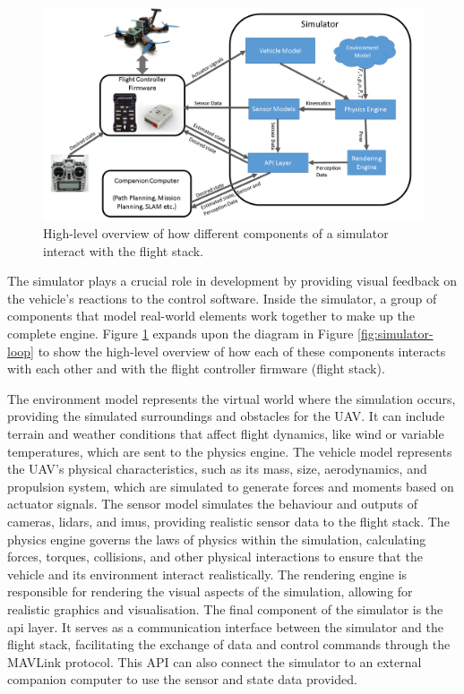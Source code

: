 \begin{figure}
  \centering
  \includegraphics[width=\textwidth,keepaspectratio]{img/airsim-overview.png}
  \caption{High-level overview of how different components of a simulator interact with the flight stack.}
  \label{fig:airsim-overview}
\end{figure}

The simulator plays a crucial role in development by providing visual feedback on the vehicle’s reactions to the control software.
Inside the simulator, a group of components that model real-world elements work together to make up the complete engine.
Figure \ref{fig:airsim-overview} expands upon the diagram in Figure \ref{fig:simulator-loop} to show the high-level overview of how each of these components interacts with each other and with the flight controller firmware (flight stack).

The environment model represents the virtual world where the simulation occurs, providing the simulated surroundings and obstacles for the UAV. It can include terrain and weather conditions that affect flight dynamics, like wind or variable temperatures, which are sent to the physics engine. 
The vehicle model represents the UAV's physical characteristics, such as its mass, size, aerodynamics, and propulsion system, which are simulated to generate forces and moments based on actuator signals.
The sensor model simulates the behaviour and outputs of cameras, lidars, and \acrshort{imu}s, providing realistic sensor data to the flight stack.
The physics engine governs the laws of physics within the simulation, calculating forces, torques, collisions, and other physical interactions to ensure that the vehicle and its environment interact realistically.
The rendering engine is responsible for rendering the visual aspects of the simulation, allowing for realistic graphics and visualisation.
The final component of the simulator is the \acrshort{api} layer. It serves as a communication interface between the simulator and the flight stack, facilitating the exchange of data and control commands through the MAVLink protocol. This API can also connect the simulator to an external companion computer to use the sensor and state data provided. 

